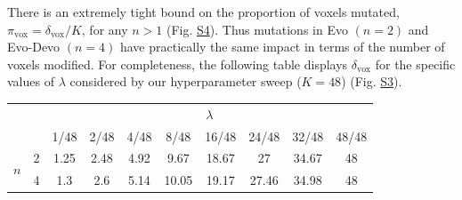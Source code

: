  
There is an extremely tight bound on the proportion of voxels mutated, $\pi_{\text{vox}} = \delta_{\text{vox}}/K$, for any $n > 1$  (Fig. \hyperref[fig:S4]{S4}).
Thus mutations in Evo $(n=2)$ and Evo-Devo $(n=4)$ have practically the same impact in terms of the number of voxels modified.
For completeness, the following table displays $\delta_{\text{vox}}$ for the specific values of $\lambda$ considered by our hyperparameter sweep ($K=48$) (Fig. \hyperref[fig:S3]{S3}). 
\vspace{-0.5em}
\begin{table}[h!]
\centering
\begin{tabular}{cccccccccc}
  & & \multicolumn{8}{c}{$\lambda$} \\ \cline{3-10}
  & \multicolumn{1}{c|}{}  & 1/48    & 2/48    & 4/48    & 8/48    & 16/48   & 24/48   & 32/48   & \multicolumn{1}{c|}{48/48} \\ \cline{2-10} 
\multicolumn{1}{c|}{\multirow{2}{*}{$n$}} & \multicolumn{1}{c|}{2} &
1.25 & 2.48 & 4.92 & 9.67 & 18.67 & 27 & 34.67 & \multicolumn{1}{c|}{48}    \\
\multicolumn{1}{c|}{}                     & \multicolumn{1}{c|}{4} & 
1.3 & 2.6 & 5.14 & 10.05 & 19.17 & 27.46 & 34.98 & \multicolumn{1}{c|}{48}    \\ \cline{2-10} 
\end{tabular}
\end{table}





